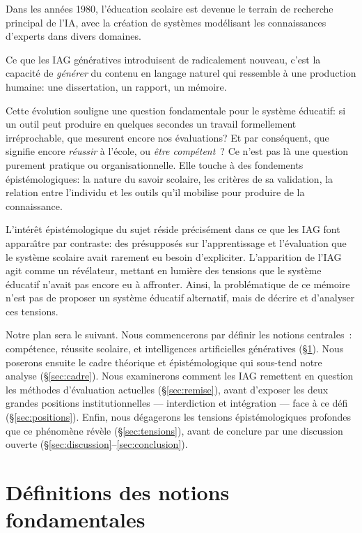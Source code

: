 Dans les années 1980, l'éducation scolaire est devenue le terrain de recherche principal de l'IA, avec la création de systèmes modélisant les connaissances d'experts dans divers domaines.

Ce que les IAG g\'en\'eratives introduisent de radicalement nouveau, c'est la capacit\'e de \emph{g\'en\'erer} du contenu en langage naturel qui ressemble \`a une production humaine: une dissertation, un rapport, un m\'emoire.

Cette \'evolution souligne une question fondamentale pour le syst\`eme \'educatif: si un outil peut produire en quelques secondes un travail formellement irr\'eprochable, que mesurent encore nos \'evaluations?
Et par cons\'equent, que signifie encore \emph{r\'eussir} \`a l'\'ecole, ou \emph{\^etre comp\'etent}~? Ce n'est pas l\`a une question purement pratique ou organisationnelle. 
Elle touche \`a des fondements \'epist\'emologiques: la nature du savoir scolaire, les crit\`eres de sa validation, la relation entre l'individu et les outils qu'il mobilise pour produire de la connaissance.

L'int\'er\^et \'epist\'emologique du sujet r\'eside pr\'ecis\'ement dans ce que les IAG font appara\^\i tre par contraste: des pr\'esuppos\'es sur l'apprentissage et l'\'evaluation que le syst\`eme scolaire avait rarement eu besoin d'expliciter.
L'apparition de l'IAG agit comme un r\'ev\'elateur, mettant en lumi\`ere des tensions que le syst\`eme \'educatif n'avait pas encore eu \`a affronter.
Ainsi, la probl\'ematique de ce m\'emoire n'est pas de proposer un syst\`eme \'educatif alternatif, mais de d\'ecrire et d'analyser ces tensions.

Notre plan sera le suivant. 
Nous commencerons par d\'efinir les notions centrales~: comp\'etence, r\'eussite scolaire, et intelligences artificielles g\'en\'eratives (\S\ref{sec:definitions}). 
Nous poserons ensuite le cadre th\'eorique et \'epist\'emologique qui sous-tend notre analyse (\S\ref{sec:cadre}). 
Nous examinerons comment les IAG remettent en question les m\'ethodes d'\'evaluation actuelles (\S\ref{sec:remise}), avant d'exposer les deux grandes positions institutionnelles --- interdiction et int\'egration --- face \`a ce d\'efi (\S\ref{sec:positions}). 
Enfin, nous d\'egagerons les tensions \'epist\'emologiques profondes que ce ph\'enom\`ene r\'ev\`ele (\S\ref{sec:tensions}), avant de conclure par une discussion ouverte (\S\ref{sec:discussion}--\ref{sec:conclusion}).


\newpage
\section{D\'efinitions des notions fondamentales}\label{sec:definitions}

